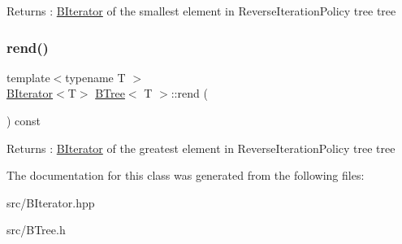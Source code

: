 \begin{DoxyReturn}{Returns}
\+: \hyperlink{classBIterator}{B\+Iterator} of the smallest element in Reverse\+Iteration\+Policy tree tree 
\end{DoxyReturn}
\mbox{\label{classBTree_af024f4b5201a49115da494161d4dcbce}} 
\subsubsection{\texorpdfstring{rend()}{rend()}}
{\footnotesize\ttfamily template$<$typename T $>$ \\
\hyperlink{classBIterator}{B\+Iterator}$<$T$>$ \hyperlink{classBTree}{B\+Tree}$<$ T $>$\+::rend (\begin{DoxyParamCaption}{ }\end{DoxyParamCaption}) const\hspace{0.3cm}{\ttfamily [noexcept]}}

\begin{DoxyReturn}{Returns}
\+: \hyperlink{classBIterator}{B\+Iterator} of the greatest element in Reverse\+Iteration\+Policy tree tree 
\end{DoxyReturn}


The documentation for this class was generated from the following files\+:\begin{DoxyCompactItemize}
\item 
src/B\+Iterator.\+hpp\item 
src/B\+Tree.\+h\end{DoxyCompactItemize}
